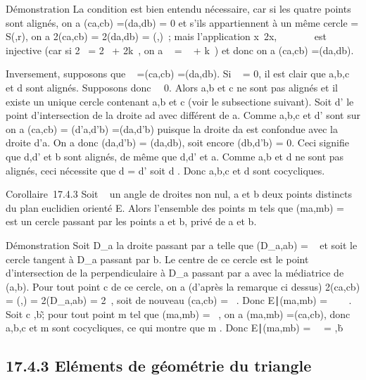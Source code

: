 \documentclass[]{article}
\begin{document}
Démonstration La condition est bien entendu nécessaire, car si les
quatre points sont alignés, on a \widehat(ca,cb)
=\widehat (da,db) = 0 et s'ils appartiennent à un
même cercle \Gamma = S(\omega,r), on a 2\widehat(ca,cb) =
2\widehat(da,db) =\widehat
(\overrightarrow\omegaa,\overrightarrow\omegab)~;
mais l'application x\mapsto~2x, ~\diagup\pi~ \rightarrow~ ~\pi~ est
injective (car si 2\alpha~ = 2\beta~ + 2k\pi~, on a \alpha~ = \beta~ + k\pi~) et donc on a
\widehat(ca,cb) =\widehat (da,db).

Inversement, supposons que \alpha~ =\widehat (ca,cb)
=\widehat (da,db). Si \alpha~ = 0, il est clair que a,b,c
et d sont alignés. Supposons donc \alpha~\neq~0. Alors
a,b et c ne sont pas alignés et il existe un unique cercle \Gamma contenant
a,b et c (voir le subsectione suivant). Soit d' le point d'intersection
de la droite ad avec \Gamma différent de a. Comme a,b,c et d' sont sur \Gamma on a
\widehat(ca,cb) =\widehat
(d'a,d'b) =\widehat (da,d'b) puisque la droite da
est confondue avec la droite d'a. On a donc
\widehat(da,d'b) =\widehat
(da,db), soit encore \widehat(db,d'b) = 0. Ceci
signifie que d,d' et b sont alignés, de même que d,d' et a. Comme a,b et
d ne sont pas alignés, ceci nécessite que d = d' soit d \in \Gamma. Donc a,b,c
et d sont cocycliques.

Corollaire~17.4.3 Soit \alpha~ un angle de droites non nul, a et b deux points
distincts du plan euclidien orienté E. Alors l'ensemble des points m
tels que \widehat(ma,mb) = \alpha~ est un cercle passant
par les points a et b, privé de a et b.

Démonstration Soit D_a la droite passant par a telle que
\widehat(D_a,ab) = \alpha~ et soit \Gamma le cercle
tangent à D_a passant par b. Le centre \omega de ce cercle est le
point d'intersection de la perpendiculaire à D_a passant par a
avec la médiatrice de (a,b). Pour tout point c de ce cercle, on a
(d'après la remarque ci dessus) 2\widehat(ca,cb)
=\widehat
(\overrightarrow\omegaa,\overrightarrow\omegab)
= 2\widehat(D_a,ab) = 2\alpha~, soit de nouveau
\widehat(ca,cb) = \alpha~. Donc \m \in
E∣\widehat(ma,mb) =
\alpha~\ \subset~ \Gamma. Soit c \in \Gamma
\diagdown\a,b\~; pour tout point m tel que
\widehat(ma,mb) = \alpha~, on a
\widehat(ma,mb) =\widehat (ca,cb),
donc a,b,c et m sont cocycliques, ce qui montre que m \in \Gamma. Donc
\m \in
E∣\widehat(ma,mb) =
\alpha~\ = \Gamma \diagdown\a,b\.

\subsection{17.4.3 Eléments de géométrie du triangle}
\end{document}
